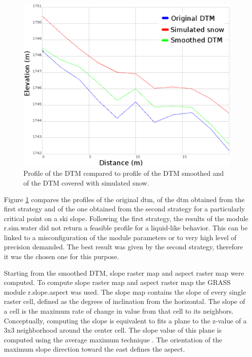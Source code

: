\documentclass[12pt,a4paper,twoside]{book}
\begin{document}
\begin{figure}[!h]
  \centering
    \includegraphics[width=\textwidth]{images/profiles_dtm.eps}
    \caption{Profile of the DTM compared to profile of the DTM smoothed and of the DTM covered with simulated snow.}\label{profile_dtm}
\end{figure}

Figure \ref{profile_dtm} compares the profiles of the original dtm, of the dtm obtained from the first strategy and of the one obtained from the second strategy for a particularly critical point on a ski slope. Following the first strategy, the results of the module r.sim.water did not return a feasible profile for a liquid-like behavior. This can be linked to a misconfiguration of the module parameters or to very high level of precision demanded. The best result was given by the second strategy, therefore it was the chosen one for this purpose.

Starting from the smoothed DTM, slope raster map and aspect raster map were computed. To compute slope raster map and aspect raster map the GRASS module r.slope.aspect was used. The slope map contains the slope of every single raster cell, defined as the degrees of inclination from the horizontal. The slope of a cell is the maximum rate of change in value from that cell to its neighbors. Conceptually, computing the slope is equivalent to fits a plane to the z-value of a 3x3 neighborhood around the center cell. The slope value of this plane is computed using the average maximum technique \cite{bur2009}. The orientation of the maximum slope direction toward the east defines the aspect.
\end{document}
